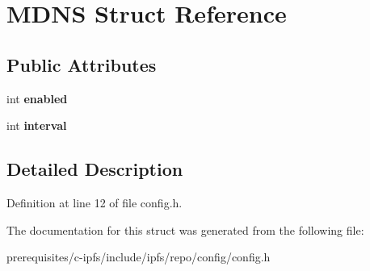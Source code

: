 \hypertarget{struct_m_d_n_s}{}\section{M\+D\+NS Struct Reference}
\label{struct_m_d_n_s}
\subsection*{Public Attributes}
\begin{DoxyCompactItemize}
\item 
\mbox{\label{struct_m_d_n_s_a32bdc91ba4e5b301dfb2d37acfa8ab41}} 
int {\bfseries enabled}
\item 
\mbox{\label{struct_m_d_n_s_a60bdbd34bd596cb434dd761a0fd4f2ad}} 
int {\bfseries interval}
\end{DoxyCompactItemize}


\subsection{Detailed Description}


Definition at line 12 of file config.\+h.



The documentation for this struct was generated from the following file\+:\begin{DoxyCompactItemize}
\item 
prerequisites/c-\/ipfs/include/ipfs/repo/config/config.\+h\end{DoxyCompactItemize}
